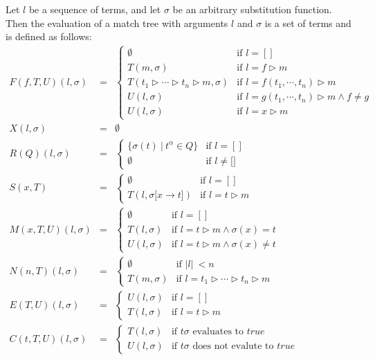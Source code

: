 \documentclass{article}
\begin{document}
Let $l$ be a sequence of terms, and let $\sigma $ be an arbitrary
substitution function. Then the evaluation of a match tree with arguments $l$
and $\sigma $ is a set of terms and is defined as follows:%
\begin{equation*}
\begin{array}{lll}
F(f,T,U)(l,\sigma ) & = & \left\{ 
\begin{array}{ll}
\emptyset & \text{if }l=[] \\ 
T(m,\sigma ) & \text{if }l=f\rhd m \\ 
T(t_{1}\rhd \cdots \rhd t_{n}\rhd m,\sigma ) & \text{if }l=f(t_{1},\cdots
,t_{n})\rhd m \\ 
U(l,\sigma ) & \text{if }l=g(t_{1},\cdots ,t_{n})\rhd m\wedge f\neq g \\ 
U(l,\sigma ) & \text{if }l=x\rhd m%
\end{array}%
\right. \\ 
X(l,\sigma ) & = & \emptyset \\ 
R(Q)(l,\sigma ) & = & \left\{ 
\begin{array}{ll}
\{\sigma (t)\ |\ t^{\alpha }\in Q\} & \text{if }l=[] \\ 
\emptyset & \text{if }l\neq \lbrack ]%
\end{array}%
\right. \\ 
S(x,T) & = & \left\{ 
\begin{array}{ll}
\emptyset & \text{if }l=[] \\ 
T(l,\sigma \lbrack x\rightarrow t]) & \text{if }l=t\rhd m%
\end{array}%
\right. \\ 
M(x,T,U)(l,\sigma ) & = & \left\{ 
\begin{array}{ll}
\emptyset & \text{if }l=[] \\ 
T(l,\sigma ) & \text{if }l=t\rhd m\wedge \sigma (x)=t \\ 
U(l,\sigma ) & \text{if }l=t\rhd m\wedge \sigma (x)\neq t%
\end{array}%
\right. \\ 
N(n,T)(l,\sigma ) & = & \left\{ 
\begin{array}{ll}
\emptyset & \text{if }|l|\ <n \\ 
T(m,\sigma ) & \text{if }l=t_{1}\rhd \cdots \rhd t_{n}\rhd m%
\end{array}%
\right. \\ 
E(T,U)(l,\sigma ) & = & \left\{ 
\begin{array}{ll}
U(l,\sigma ) & \text{if }l=[] \\ 
T(l,\sigma ) & \text{if }l=t\rhd m%
\end{array}%
\right. \\ 
C(t,T,U)(l,\sigma ) & = & \left\{ 
\begin{array}{ll}
T(l,\sigma ) & \text{if }t\sigma \text{ evaluates to }true \\ 
U(l,\sigma ) & \text{if }t\sigma \text{ does not evalute to }true%
\end{array}%
\right.%
\end{array}%
\end{equation*}%
\end{document}
